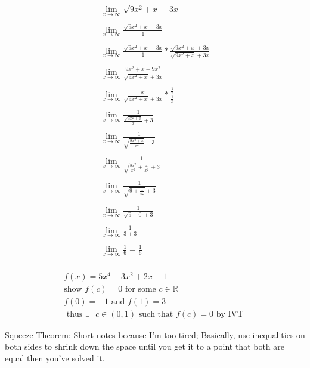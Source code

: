 \documentclass[12pt, english]{article}
\begin{document}
\begin{equation}
	\begin{split}
		\lim_{x \to \infty} \sqrt{9x^2 + x} - 3x \\
		\\
		\lim_{x \to \infty} \frac{\sqrt{9x^2 + x} - 3x}{1} \\
		\\
		\lim_{x \to \infty} \frac{\sqrt{9x^2 + x} - 3x}{1} * \frac{\sqrt{9x^2 + x} + 3x}{\sqrt{9x^2 + x} + 3x} \\
		\\
		\lim_{x \to \infty} \frac{9x^2 + x - 9x^2}{\sqrt{9x^2 + x} + 3x} \\
		\\
		\lim_{x \to \infty} \frac{x}{\sqrt{9x^2 + x} + 3x} * \frac{\frac{1}{x}}{\frac{1}{x}} \\
		\\
		\lim_{x \to \infty} \frac{1}{\frac{\sqrt{9x^2 + x}}{x} + 3} \\
		\\
		\lim_{x \to \infty} \frac{1}{\sqrt{\frac{9x^2 + x}{x^2}} + 3} \\
		\\
		\lim_{x \to \infty} \frac{1}{\sqrt{\frac{9x^2}{x^2} + \frac{x}{x^2}} + 3} \\
		\\
		\lim_{x \to \infty} \frac{1}{\sqrt{9 + \frac{1}{\infty}} + 3} \\
		\\
		\lim_{x \to \infty} \frac{1}{\sqrt{9 + 0} + 3} \\
		\\
		\lim_{x \to \infty} \frac{1}{3 + 3} \\
		\\
		\lim_{x \to \infty} \frac{1}{6} = \frac{1}{6} \\
	\end{split}
\end{equation}

\begin{equation}
	\begin{split}
		f(x) = 5x^4 - 3x^2 + 2x - 1 \\
		\text{show  } f(c) = 0 \text{ for some }
		c \in \mathbb{R} \\
		f(0) = -1 \text{ and } f(1) = 3 \\
		\text{ thus } \exists \text { } c \in (0,1) \text{ such that } f(c) = 0 \text{ by IVT } 
	\end{split}
\end{equation}

	Squeeze Theorem:
	Short notes because I'm too tired; Basically, use inequalities on both sides to 
	shrink down the space until you get it to a point that both are equal then you've solved it.
\end{document}
